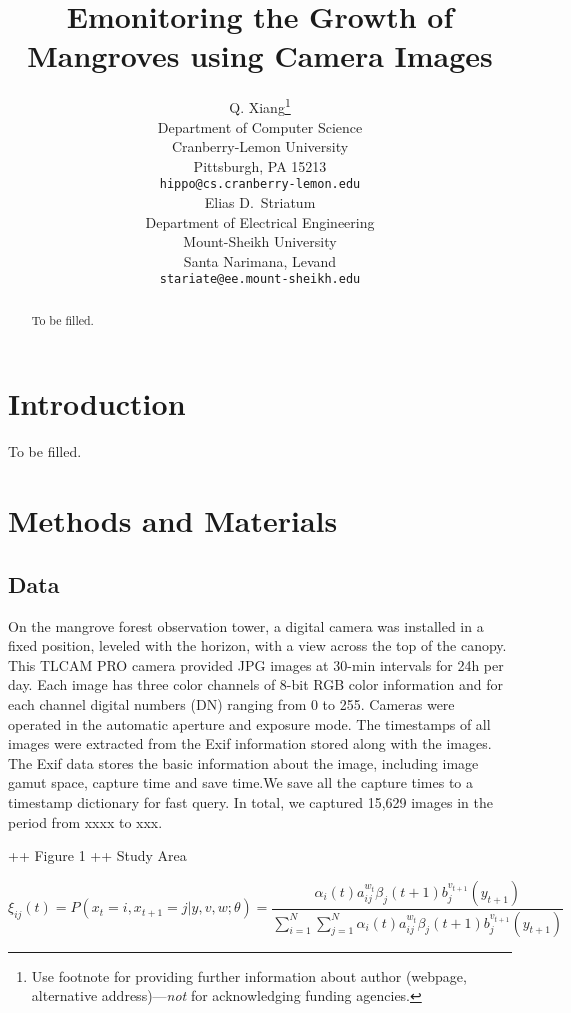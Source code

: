 \documentclass{article}
\title{Emonitoring the Growth of Mangroves using Camera Images}
\author{
  Q. Xiang\thanks{Use footnote for providing further
    information about author (webpage, alternative
    address)---\emph{not} for acknowledging funding agencies.} \\
  Department of Computer Science\\
  Cranberry-Lemon University\\
  Pittsburgh, PA 15213 \\
  \texttt{hippo@cs.cranberry-lemon.edu} \\
   \And
 Elias D.~Striatum \\
  Department of Electrical Engineering\\
  Mount-Sheikh University\\
  Santa Narimana, Levand \\
  \texttt{stariate@ee.mount-sheikh.edu} \\
}
\begin{document}
\maketitle

\begin{abstract}
To be filled.
\end{abstract}




\section{Introduction}
To be filled. 


\section{Methods and Materials}
\label{sec:headings}


\subsection{Data}
On the mangrove forest observation tower, a digital camera was installed in a fixed position, leveled with the horizon, with a view across the top of the canopy. This TLCAM PRO camera provided JPG images at 30-min intervals for 24h per day. Each image has three color channels of 8-bit RGB color information and for each channel digital numbers (DN) ranging from 0 to 255. Cameras were operated in the automatic aperture and exposure mode. The timestamps of all images were extracted from the Exif information stored along with the images. The Exif data stores the basic information about the image, including image gamut space, capture time and save time.We save all the capture times to a timestamp dictionary for fast query. In total, we captured 15,629 images in the period from xxxx to xxx.  \color[red]{Figure 1 shows two image examples and the extracted timestamps.}

++ Figure 1 
++ Study Area


\begin{equation}
\xi _{ij}(t)=P(x_{t}=i,x_{t+1}=j|y,v,w;\theta)= {\frac {\alpha _{i}(t)a^{w_t}_{ij}\beta _{j}(t+1)b^{v_{t+1}}_{j}(y_{t+1})}{\sum _{i=1}^{N} \sum _{j=1}^{N} \alpha _{i}(t)a^{w_t}_{ij}\beta _{j}(t+1)b^{v_{t+1}}_{j}(y_{t+1})}}
\end{equation}
\end{document}
